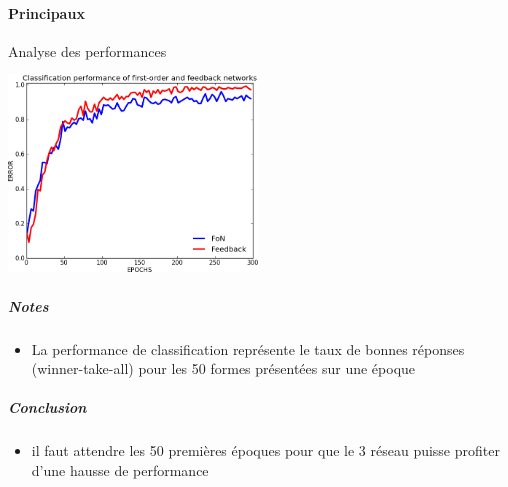     \paragraph{Principaux}
      Analyse des performances
      \begin{center}
	\includegraphics[width=250px]{data/expF3/perff.png}
      \end{center}
      \subparagraph{Notes}
	\begin{itemize}
	  \item La performance de classification représente le taux de bonnes réponses (winner-take-all) pour les 50 formes présentées sur une époque
	\end{itemize}
      \subparagraph{Conclusion}
	\begin{itemize}
	  \item il faut attendre les 50 premières époques pour que le 3 réseau puisse profiter d'une hausse de performance
	\end{itemize}
